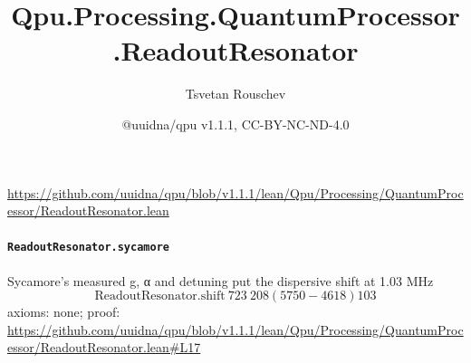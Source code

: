 \documentclass[11pt]{article}
\title{Qpu.Processing.QuantumProcessor.ReadoutResonator}
\author{Tsvetan Rouschev}
\date{@uuidna/qpu v1.1.1, CC-BY-NC-ND-4.0}
\begin{document}
\maketitle
\noindent\url{https://github.com/uuidna/qpu/blob/v1.1.1/lean/Qpu/Processing/QuantumProcessor/ReadoutResonator.lean}

\paragraph{\texttt{ReadoutResonator.sycamore}}
Sycamore's measured g, α and detuning put the dispersive shift at 1.03 MHz
\[ \mathrm{ReadoutResonator.shift}\ 723\ 208 (5750 - 4618) 103 \]
\noindent axioms: none; proof: \url{https://github.com/uuidna/qpu/blob/v1.1.1/lean/Qpu/Processing/QuantumProcessor/ReadoutResonator.lean\#L17}
\end{document}
